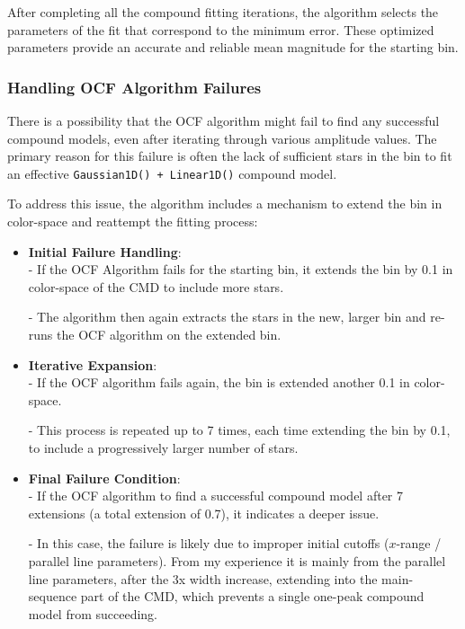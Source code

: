 \documentclass[svgnames]{article}     %
\begin{document}
After completing all the compound fitting iterations, the algorithm selects the
parameters of the fit that correspond to the minimum error. These optimized
parameters provide an accurate and reliable mean magnitude for the starting
bin.

\subsubsection{Handling OCF Algorithm Failures} 

There is a possibility that the OCF algorithm might fail to find any successful
compound models, even after iterating through various amplitude values. The
primary reason for this failure is often the lack of sufficient stars in the
bin to fit an effective \verb|Gaussian1D() + Linear1D()| compound model. 

To address this issue, the algorithm includes a mechanism to extend the bin in
color-space and reattempt the fitting process: 

\begin{itemize}
  \item[1.] \textbf{Initial Failure Handling}: \\
    - If the OCF Algorithm fails for the starting bin, it extends the bin by 0.1
    in color-space of the CMD to include more stars. 

    - The algorithm then again extracts the stars in the new, larger bin and
    re-runs the OCF algorithm on the extended bin. 
  \item[2.] \textbf{Iterative Expansion}: \\
    - If the OCF algorithm fails again, the bin is extended another 0.1 in
    color-space. 

    - This process is repeated up to 7 times, each time extending the bin by 0.1,
    to include a progressively larger number of stars. 
  \item[3.] \textbf{Final Failure Condition}: \\
    - If the OCF algorithm to find a successful compound model after 7 extensions
    (a total extension of 0.7), it indicates a deeper issue.  

    - In this case, the failure is likely due to improper initial cutoffs
    ($x$-range / parallel line parameters). From my experience it is mainly
    from the parallel line parameters, after the 3x width increase, extending
    into the main-sequence part of the CMD, which prevents a single one-peak
    compound model from succeeding. 
\end{itemize} 
\end{document}
